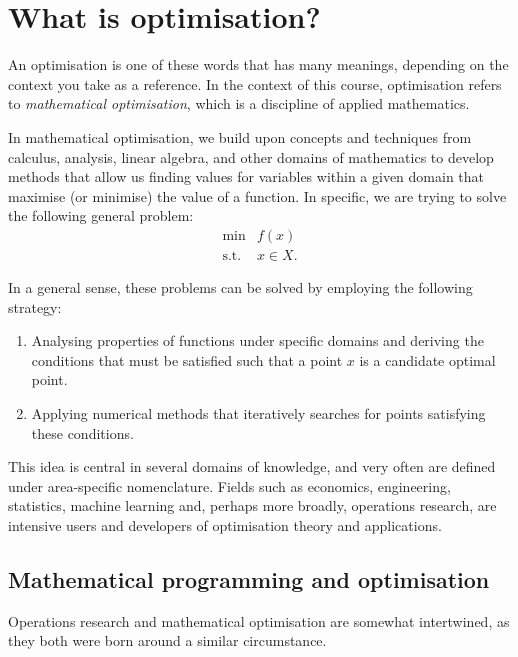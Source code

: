\section{What is optimisation?}

An optimisation is one of these words that has many meanings, depending on the context you take as a reference. In the context of this course, optimisation refers to \emph{mathematical optimisation}, which is a discipline of applied mathematics.

In mathematical optimisation, we build upon concepts and techniques from calculus, analysis, linear algebra, and other domains of mathematics to develop methods that allow us finding values for variables within a given domain that maximise (or minimise) the value of a function. In specific, we are trying to solve the following general problem:
%
\begin{align}
    \min &f(x) \label{eq:opt_prob} \\
    \text{s.t.}   &x \in X. \nonumber
\end{align}
%

In a general sense, these problems can be solved by employing the following strategy:
%
\begin{enumerate}
    \item Analysing properties of functions under specific domains and deriving the conditions that must be satisfied such that a point $x$ is a candidate optimal point.
    \item Applying numerical methods that iteratively searches for points satisfying these conditions. 
\end{enumerate}
%
This idea is central in several domains of knowledge, and very often are defined under area-specific nomenclature. Fields such as economics, engineering, statistics, machine learning and, perhaps more broadly, operations research, are intensive users and developers of optimisation theory and applications. 

\subsection{Mathematical programming and optimisation}

Operations research and mathematical optimisation are somewhat intertwined, as they both were born around a similar circumstance. %

